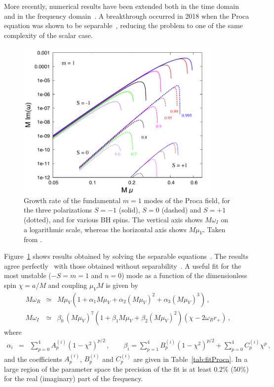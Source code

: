 \documentclass[11pt]{article}
\numberwithin{equation}{section} %
\begin{document}
More recently, numerical results have been extended both in the 
time domain~\cite{East:2018glu} and in the frequency domain~\cite{Cardoso:2018tly,Baumann:2019eav}. A breakthrough occurred in 2018 
when the Proca equation was shown to be separable~\cite{Frolov:2018ezx}, reducing the problem to one of the same 
complexity of the scalar case.


\begin{figure}
\begin{center}
 \includegraphics[width=10cm]{l1m1_imag_pol.pdf}
\end{center}
\caption{
Growth rate of the fundamental $m = 1$ modes of the Proca field, for the three polarizations 
$S = -1$ (solid), $S = 0$ (dashed) and $S = +1$ (dotted), and for various BH spins. The vertical axis shows 
$M\omega_I$ on a logarithmic scale, whereas the horizontal axis shows $M \mu_V$. Taken from \cite{Dolan:2018dqv}.
}
\label{fig:Proca}
\end{figure}

Figure~\ref{fig:Proca} shows results obtained by solving the separable equations~\cite{Dolan:2018dqv}. The results 
agree perfectly~\cite{Frolov:2018ezx} with those obtained without separability~\cite{Cardoso:2018tly}.
%
A useful fit for the most unstable ($-S=m=1$ and $n=0$) mode as a 
function of the dimensionless spin $\chi=a/M$ and coupling $\mu_V M$ is given by~\cite{Cardoso:2018tly}	
%
\begin{eqnarray}
M\omega_R &\simeq& 
M\mu_V\left(1+\alpha_1M\mu_V+\alpha_2(M\mu_V)^2+\alpha_3(M\mu_V)^3\right)\,, 
\label{fitProcaR}\\
%
M\omega_I &\simeq& \beta_0\, (M\mu_V)^7\left(1+\beta_1M\mu_V+\beta_2(M\mu_V)^2\right) \left(\chi- 2 
\omega_R r_+\right) \,, \label{fitProcaI}
\end{eqnarray}
%
where 
\begin{eqnarray}
 \alpha_i &=& \sum_{p=0}^4 A_p^{(i)}(1-\chi^2)^{p/2}\,,\qquad \beta_i =\sum_{p=1}^4 
B_p^{(i)}(1-\chi^2)^{p/2}+\sum_{p=0}^4 C_p^{(i)} \chi^{p}\,, \label{alphabetafit}
\end{eqnarray}
and the coefficients $A_p^{(i)}$, $B_p^{(i)}$ and $C_p^{(i)}$ are given in Table~\ref{tab:fitProca}. 
In a large region of the parameter space the precision of the fit is at least $0.2\%$ ($50$\%) for the real (imaginary) 
part of the frequency. 
\end{document}
